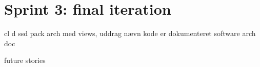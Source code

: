 \section{Sprint 3: final iteration}





\newpage

cl d
ssd
pack
arch med views, uddrag
nævn kode er dokumenteret
software arch doc

future stories